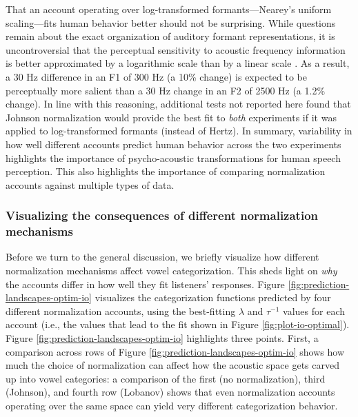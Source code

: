\documentclass[preprint]{JASA}
\begin{document}
That an account operating over log-transformed formants---Nearey's uniform scaling---fits human behavior better should not be surprising. While questions remain about the exact organization of auditory formant representations, it is uncontroversial that the perceptual sensitivity to acoustic frequency information is better approximated by a logarithmic scale than by a linear scale \citep[see][]{moore2012}. As a result, a 30 Hz difference in an F1 of 300 Hz (a 10\% change) is expected to be perceptually more salient than a 30 Hz change in an F2 of 2500 Hz (a 1.2\% change). In line with this reasoning, additional tests not reported here found that Johnson normalization would provide the best fit to \emph{both} experiments if it was applied to log-transformed formants (instead of Hertz). In summary, variability in how well different accounts predict human behavior across the two experiments highlights the importance of psycho-acoustic transformations for human speech perception. This also highlights the importance of comparing normalization accounts against multiple types of data.

\subsubsection{Visualizing the consequences of different normalization mechanisms}\label{sec:visualizing-consequences}

Before we turn to the general discussion, we briefly visualize how different normalization mechanisms affect vowel categorization. This sheds light on \emph{why} the accounts differ in how well they fit listeners' responses. Figure \ref{fig:prediction-landscapes-optim-io} visualizes the categorization functions predicted by four different normalization accounts, using the best-fitting \(\lambda\) and \(\tau^{-1}\) values for each account (i.e., the values that lead to the fit shown in Figure \ref{fig:plot-io-optimal}). Figure \ref{fig:prediction-landscapes-optim-io} highlights three points. First, a comparison across rows of Figure \ref{fig:prediction-landscapes-optim-io} shows how much the choice of normalization can affect how the acoustic space gets carved up into vowel categories: a comparison of the first (no normalization), third (Johnson), and fourth row (Lobanov) shows that even normalization accounts operating over the same space can yield very different categorization behavior.
\end{document}
